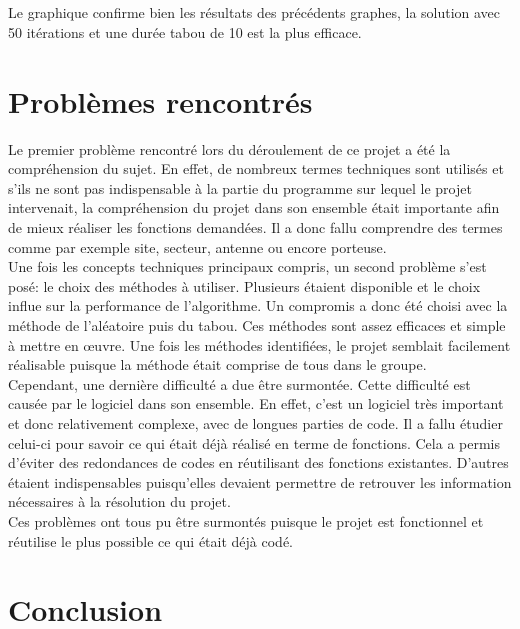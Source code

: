 \documentclass[a4paper, 11pt]{report}
\begin{document}
    \paragraph{}Le graphique confirme bien les résultats des précédents graphes, la solution avec 50
    itérations et une durée tabou de 10 est la plus efficace.

\chapter{Problèmes rencontrés}

	Le premier problème rencontré lors du déroulement de ce projet a été la compréhension du sujet. En effet, de nombreux termes techniques sont utilisés et s'ils ne sont pas indispensable à la partie du programme sur lequel le projet intervenait, la compréhension du projet dans son ensemble était importante afin de mieux réaliser les fonctions demandées. Il a donc fallu comprendre des termes comme par exemple site, secteur, antenne ou encore porteuse.\\
	Une fois les concepts techniques principaux compris, un second problème s'est posé: le choix des méthodes à utiliser. Plusieurs étaient disponible et le choix influe sur la performance de l'algorithme. Un compromis a donc été choisi avec la méthode de l'aléatoire puis du tabou. Ces méthodes sont assez efficaces et simple à mettre en œuvre. Une fois les méthodes identifiées, le projet semblait facilement réalisable puisque la méthode était comprise de tous dans le groupe.\\
	Cependant, une dernière difficulté a due être surmontée. Cette difficulté est causée par le logiciel dans son ensemble. En effet, c'est un logiciel très important et donc relativement complexe, avec de longues parties de code. Il a fallu étudier celui-ci pour savoir ce qui était déjà réalisé en terme de fonctions. Cela a permis d'éviter des redondances de codes en réutilisant des fonctions existantes. D'autres étaient indispensables puisqu'elles devaient permettre de retrouver les information nécessaires à la résolution du projet.\\
	Ces problèmes ont tous pu être surmontés puisque le projet est fonctionnel et réutilise le plus possible ce qui était déjà codé.

\chapter*{Conclusion}
\end{document}
